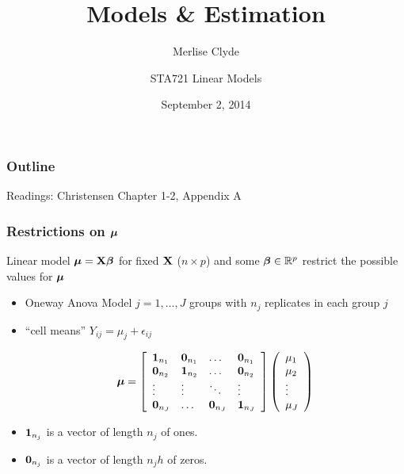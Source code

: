 \documentclass[handout]{beamer}
\title{Models \& Estimation}
\subtitle{Merlise Clyde}
\author{STA721 Linear Models}
\institute{Duke University}
\date{September 2, 2014}
\begin{document}
\maketitle

\begin{frame}\frametitle{Outline}
  \tableofcontents

Readings: Christensen Chapter 1-2, Appendix A
\end{frame}

\begin{frame}
  \frametitle{Restrictions on $\boldsymbol{\mu}$}
Linear model $\boldsymbol{\mu} = \mathbf{X} \boldsymbol{\beta}$ for fixed $\mathbf{X}$ ($n \times p$) and some $\boldsymbol{\beta}
\in \mathbb{R}^p$  restrict the possible values for $\boldsymbol{\mu}$  \pause

\begin{itemize}
\item  Oneway Anova Model  $j = 1, \ldots, J$ groups with $n_j$
  replicates in each group $j$ \pause
\item {``cell  means'' $Y_{ij} = \mu_j + \epsilon_{ij}$ }


$$\boldsymbol{\mu} = {\left[
  \begin{array}{llll}
    \mathbf{1}_{n_1} & \mathbf{0}_{n_1} & \ldots & \mathbf{0}_{n_1} \\
    \mathbf{0}_{n_2} & \mathbf{1}_{n_2} & \ldots & \mathbf{0}_{n_2} \\
    \vdots & \vdots & \ddots & \vdots \\
    \mathbf{0}_{n_J} & \ldots & \mathbf{0}_{n_J} & \mathbf{1}_{n_J} \\
  \end{array}
   \right] \left(
     \begin{array}{l}
\mu_1 \\ \mu_2 \\ \vdots \\ \mu_J 
    \end{array}
\right) }$$
\item $\mathbf{1}_{n_j}$ is a vector of length $n_j$ of ones. 
\item  $\mathbf{0}_{n_j}$ is a vector of length $n_jh$ of zeros.
\end{itemize}

\end{frame}
\end{document}
